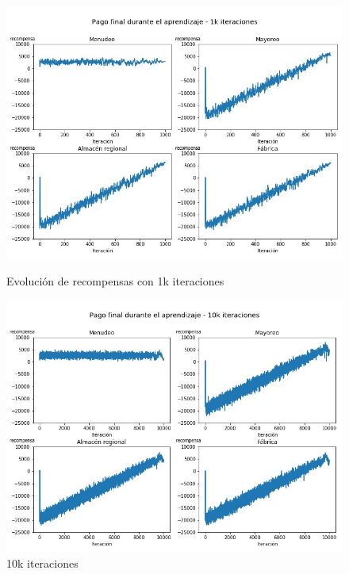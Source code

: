 \begin{figure}[!htb]
   \begin{minipage}{0.48\textwidth}
     \centering
     \includegraphics[width=0.9\linewidth]{tesis_tex/figs/policyiteration_payouts_1000.png}
     \caption{Evoluci\'on de recompensas con 1k iteraciones}\label{politer_payouts_1000}
   \end{minipage}\hfill
   \begin{minipage}{0.48\textwidth}
     \centering
     \includegraphics[width=0.9\linewidth]{tesis_tex/figs/policyiteration_payouts_10000.png}
     \caption{10k iteraciones}\label{politer_payouts_10000}
   \end{minipage}
\end{figure}

